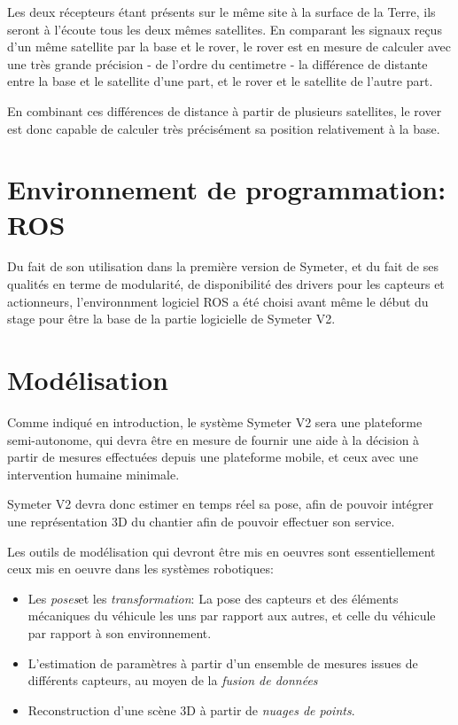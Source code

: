 \documentclass[12pt,a4paper]{report}
\begin{document}
		\para Les deux récepteurs étant présents sur le même site à la surface de la Terre, ils seront à l'écoute tous les deux mêmes satellites. En comparant les signaux reçus d'un même satellite par la base et le rover, le rover est en mesure de calculer avec une très grande précision - de l'ordre du centimetre - la différence de distante entre la base et le satellite d'une part, et le rover et le satellite de l'autre part. 
		

		\para En combinant ces différences de distance à partir de plusieurs satellites, le rover est donc capable de calculer très précisément sa position relativement à la base.
		\newpage
		
		
	\section{Environnement de programmation: ROS}
	Du fait de son utilisation dans la première version de Symeter, et du fait de ses qualités en terme de modularité, de disponibilité des drivers pour les capteurs et actionneurs, l'environnment logiciel ROS a été choisi avant même le début du stage pour être la base de la partie logicielle de Symeter V2.

	
	
		
	\section{Modélisation}
	
	\para Comme indiqué en introduction, le système Symeter V2 sera une plateforme semi-autonome, qui devra être en mesure de fournir une aide à la décision à partir de mesures effectuées depuis une plateforme mobile, et ceux avec une intervention humaine minimale.
	
	\para Symeter V2 devra donc estimer en temps réel sa pose, afin de pouvoir intégrer une représentation 3D du chantier afin de pouvoir effectuer son service.
	
	\para Les outils de modélisation qui devront être mis en oeuvres sont essentiellement ceux mis en oeuvre dans les systèmes robotiques:
	 \begin{itemize}
	 	\item Les \textit{poses}et les \textit{transformation}: La pose des capteurs et des éléments mécaniques du véhicule les uns par rapport aux autres, et celle du véhicule par rapport à son environnement.
	 	\item L'estimation de paramètres à partir d'un ensemble de mesures issues de différents capteurs, au moyen de la \textit{fusion de données}
	 	\item Reconstruction d'une scène 3D à partir de \textit{nuages de points}.
	 \end{itemize} 
 
\end{document}
